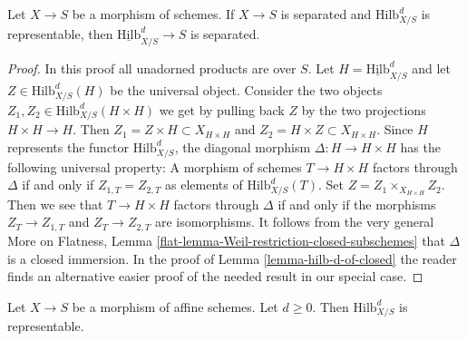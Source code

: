 \begin{lemma}
\label{lemma-hilb-d-separated}
Let $X \to S$ be a morphism of schemes. If $X \to S$ is separated and
$\text{Hilb}^d_{X/S}$ is representable,
then $\underline{\text{Hilb}}^d_{X/S} \to S$ is separated.
\end{lemma}

\begin{proof}
In this proof all unadorned products are over $S$.
Let $H = \underline{\text{Hilb}}^d_{X/S}$ and let
$Z \in \text{Hilb}^d_{X/S}(H)$ be the universal object.
Consider the two objects $Z_1, Z_2 \in \text{Hilb}^d_{X/S}(H \times H)$
we get by pulling back $Z$ by the two projections $H \times H \to H$.
Then $Z_1 = Z \times H \subset X_{H \times H}$ and $Z_2 = H \times Z
\subset X_{H \times H}$. Since $H$ represents the functor
$\text{Hilb}^d_{X/S}$, the diagonal morphism $\Delta : H \to H \times H$
has the following universal property: A morphism of schemes
$T \to H \times H$ factors through $\Delta$ if and only if
$Z_{1, T} = Z_{2, T}$ as elements of $\text{Hilb}^d_{X/S}(T)$.
Set $Z = Z_1 \times_{X_{H \times H}} Z_2$. Then we see that
$T \to H \times H$ factors through $\Delta$ if and only if
the morphisms $Z_T \to Z_{1, T}$ and $Z_T \to Z_{2, T}$ are
isomorphisms. It follows from the very general
More on Flatness, Lemma \ref{flat-lemma-Weil-restriction-closed-subschemes}
that $\Delta$ is a closed immersion. In the proof of
Lemma \ref{lemma-hilb-d-of-closed}
the reader finds an alternative easier proof of the needed result
in our special case.
\end{proof}

\begin{lemma}
\label{lemma-hilb-d-An}
Let $X \to S$ be a morphism of affine schemes. Let $d \geq 0$. Then
$\text{Hilb}^d_{X/S}$ is representable.
\end{lemma}

